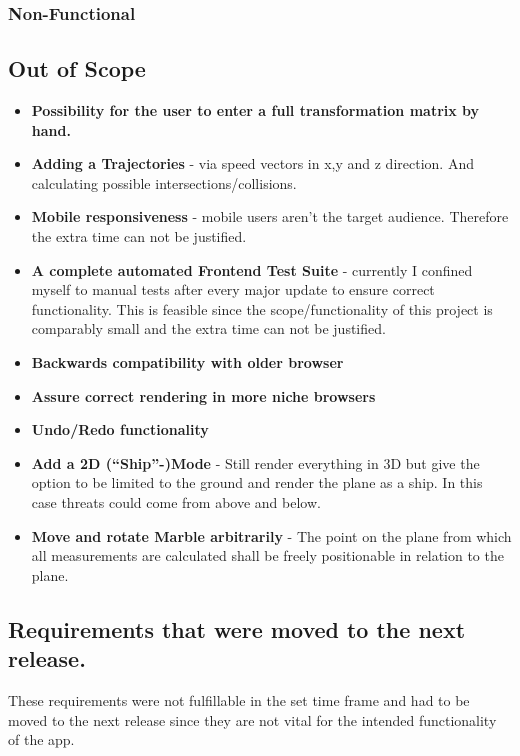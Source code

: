 \subsubsection{Non-Functional}


\newpage
\subsection{Out of Scope}
\begin{itemize}
\item \textbf{Possibility for the user to enter a full transformation matrix by hand.}
\item \textbf{Adding a Trajectories} - via speed vectors in x,y and z direction. And calculating possible intersections/collisions.
\item \textbf{Mobile responsiveness} - mobile users aren't the target audience. Therefore the extra time can not be justified.
\item \textbf{A complete automated Frontend Test Suite} - currently I confined myself to manual tests after every major update to ensure correct functionality. This is feasible since the scope/functionality of this project is comparably small and the extra time can not be justified.
\item \textbf{Backwards compatibility with older browser}
\item \textbf{Assure correct rendering in more niche browsers}
\item \textbf{Undo/Redo functionality}
\item \textbf{Add a 2D (\enquote{Ship}-)Mode} - Still render everything in 3D but give the option to be limited to the ground and render the plane as a ship. In this case threats could come from above and below.
\item \textbf{Move and rotate Marble arbitrarily} - The point on the plane from which all measurements are calculated shall be freely positionable in relation to the plane.
\end{itemize}

\subsection{Requirements that were moved to the next release.}

These requirements were not fulfillable in the set time frame and had to be moved to the next release since they are not vital for the intended functionality of the app.

